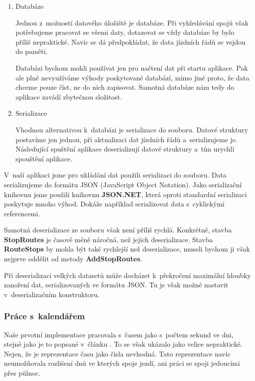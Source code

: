 \begin{enumerate}
    \item Databáze

    Jednou z~možností datového úložiště je databáze. Při vyhledávání spojů však potřebujeme pracovat se všemi daty, dotazovat se vždy databáze by bylo příliš nepraktické. Navíc se dá předpokládat, že data jízdních řádů se vejdou do paměti.
    
    Databázi bychom mohli používat jen pro načtení dat při startu aplikace. Pak ale plně nevyužíváme výhody poskytované databází, mimo jiné proto, že data chceme pouze číst, ne do nich zapisovat. Samotná databáze nám tedy do aplikace zavádí zbytečnou složitost.
    
    \item Serializace
    
    Vhodnou alternativou k~databázi je serializace do souboru. Datové struktury postavíme jen jednou, při aktualizaci dat jízdních řádů a~serializujeme je. Následující spuštění aplikace deserializují datové struktury a~tím urychlí spouštění aplikace.
\end{enumerate}

V~naší aplikaci jsme pro ukládání dat použili serializaci do souboru. Data serializujeme do formátu JSON (JavaScript Object Notation). Jako serializační knihovnu jsme použili knihovnu \textbf{JSON.NET}, která oproti standardní serializaci poskytuje mnoho výhod. Dokáže například serializovat data s~cyklickými referencemi.

Samotná deserializace ze souboru však není příliš rychlá. Konkrétně, stavba \textbf{StopRoutes} je časově méně náročná, než jejich deserializace. Stavba \textbf{RouteStops} by mohla být také rychlejší než deserializace, museli bychom ji však nejprve oddělit od metody \textbf{AddStopRoutes}.

Při deserializaci velkých datasetů může docházet k~překročení maximální hloubky zanoření dat, serializovaných ve formátu JSON. Tu je však možné nastavit v~deserializačním konstruktoru.

\subsubsection{Práce s~kalendářem}

Naše prvotní implementace pracovala s~časem jako s~počtem sekund ve dni, stejně jako je to popsané v~článku \citep{raptor}. To se však ukázalo jako velice nepraktické. Nejen, že je reprezentace času jako čísla nevhodná. Tato reprezentace navíc neumožňovala rozlišení dnů ve kterých spoje jezdí, ani práci se spoji jedoucími přes půlnoc.

